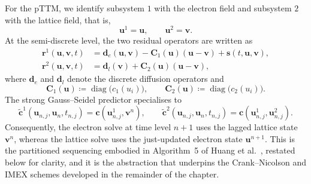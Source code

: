 For the pTTM, we identify subsystem $1$ with the electron field and subsystem $2$ with the lattice field, that is,
\begin{equation}
    \mathbf{u}^1 = \mathbf{u}, \qquad \mathbf{u}^2 = \mathbf{v}.
\end{equation}
At the semi-discrete level, the two residual operators are written as
\begin{align}
    \mathbf{r}^1(\mathbf{u}, \mathbf{v}, t) & = \mathbf{d}_e(\mathbf{u}, \mathbf{v}) - \mathbf{C}_1(\mathbf{u})(\mathbf{u}-\mathbf{v}) + \mathbf{s}(t,\mathbf{u},\mathbf{v}), \label{eq:ch2-r1} \\
    \mathbf{r}^2(\mathbf{u}, \mathbf{v}, t) & = \mathbf{d}_l(\mathbf{v}) + \mathbf{C}_2(\mathbf{u})(\mathbf{u}-\mathbf{v}), \label{eq:ch2-r2}
\end{align}
where $\mathbf{d}_e$ and $\mathbf{d}_l$ denote the discrete diffusion operators and
\begin{equation}
    \mathbf{C}_1(\mathbf{u}) \coloneqq \operatorname{diag}\bigl(c_1(u_i)\bigr), \qquad
    \mathbf{C}_2(\mathbf{u}) \coloneqq \operatorname{diag}\bigl(c_2(u_i)\bigr).
\end{equation}
The strong Gauss--Seidel predictor specialises to
\begin{equation}
    \tilde{\mathbf{c}}^1(\mathbf{u}_{n,j}, \mathbf{u}_n, t_{n,j}) = \mathbf{c}(\mathbf{u}_{n,j}^1, \mathbf{v}^n), \qquad
    \tilde{\mathbf{c}}^2(\mathbf{u}_{n,j}, \mathbf{u}_n, t_{n,j}) = \mathbf{c}(\mathbf{u}_{n,j}^1, \mathbf{u}_{n,j}^2).
\end{equation}
Consequently,
the electron solve at time level $n+1$ uses the lagged lattice state $\mathbf{v}^n$, whereas the lattice solve uses the just-updated electron state $\mathbf{u}^{n+1}$.
This is the partitioned sequencing embodied in Algorithm~5 of Huang et al.\ \cite{Huang_2019}, restated below for clarity,
and it is the abstraction that underpins the Crank--Nicolson and IMEX schemes developed in the remainder of the chapter.

